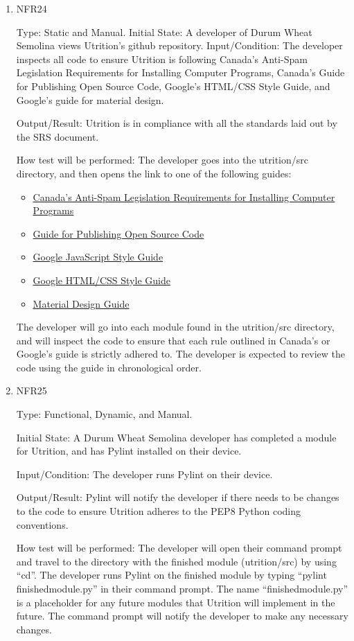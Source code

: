 \documentclass[12pt, titlepage]{article}
\begin{document}
\begin{enumerate}
\item{NFR24\\}
 
Type: Static and Manual.
Initial State: A developer of Durum Wheat Semolina views Utrition’s github repository.
Input/Condition: The developer inspects all code to ensure Utrition is following Canada’s Anti-Spam Legislation Requirements for Installing Computer Programs, Canada’s Guide for Publishing Open Source Code, Google’s HTML/CSS Style Guide, and Google’s guide for material design.

Output/Result: Utrition is in compliance with all the standards laid out by the SRS document.

How test will be performed: The developer goes into the utrition/src directory, and then opens the link to one of the following guides:
\begin{itemize}
	\item \href{https://crtc.gc.ca/eng/internet/install.htm}{Canada’s Anti-Spam Legislation Requirements for Installing Computer Programs}
	\item \href{https://www.canada.ca/en/government/system/digital-government/digital-government-innovations/open-source-software/guide-for-publishing-open-source-code.html}{Guide for Publishing Open Source Code}
	\item \href{https://google.github.io/styleguide/jsguide.html}{Google JavaScript Style Guide}
	\item \href{https://google.github.io/styleguide/htmlcssguide.html}{Google HTML/CSS Style Guide}
	\item \href{https://material.io/design}{Material Design Guide}
\end{itemize}
The developer will go into each module found in the utrition/src directory, and will inspect the code to ensure that each rule outlined in Canada’s or Google’s guide is strictly adhered to. The developer is expected to review the code using the guide in chronological order.

\item{NFR25\\}

Type: Functional, Dynamic, and Manual.

Initial State: A Durum Wheat Semolina developer has completed a module for Utrition, and has Pylint installed on their device.

Input/Condition: The developer runs Pylint on their device.

Output/Result: Pylint will notify the developer if there needs to be changes to the code to ensure Utrition adheres to the PEP8 Python coding conventions.

How test will be performed: The developer will open their command prompt and travel to the directory with the finished module (utrition/src) by using “cd”. The developer runs Pylint on the finished module by typing “pylint finishedmodule.py” in their command prompt. The name “finishedmodule.py” is a placeholder for any future modules that Utrition will implement in the future. The command prompt will notify the developer to make any necessary changes.

	
\end{enumerate}
\end{document}

